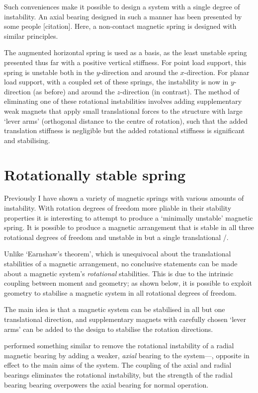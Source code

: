 \documentclass[11pt,a4paper]{memoir}
\begin{document}
Such conveniences make it possible to design a system with a single
degree of instability. An axial bearing designed in such a manner has
been presented by some people [citation]. Here, a non-contact magnetic
spring is designed with similar principles.

The augmented horizontal spring is used as a basis, as the least
unstable spring presented thus far with a positive vertical
stiffness. For point load support, this spring is unstable both in the
$y$-direction and around the $x$-direction. For planar load support,
with a coupled set of these springs, the instability is now in $y$-direction
(as before) and around the $z$-direction (in contrast). The
method of eliminating one of these rotational instabilities involves
adding supplementary weak magnets that apply small translational
forces to the structure with large `lever arms' (orthogonal distance
to the centre of rotation), such that the added translation stiffness
is negligible but the added rotational stiffness is significant and
stabilising.


\section{Rotationally stable spring}

Previously I have shown a variety of magnetic springs with various
amounts of instability. With rotation degrees of freedom more pliable
in their stability properties it is interesting to attempt to produce
a `minimally unstable' magnetic spring. It is possible to produce a
magnetic arrangement that is stable in all three rotational degrees of
freedom and unstable in but a single translational \dof/.

Unlike `Earnshaw's theorem', which is unequivocal about the
translational stabilities of a magnetic arrangement, no conclusive
statements can be made about a magnetic system's \emph{rotational}
stabilities. This is due to the intrinsic coupling between moment and
geometry; as shown below, it is possible to exploit geometry to
stabilise a magnetic system in all rotational degrees of freedom.

The main idea is that a magnetic system can be
stabilised in all but one translational direction, and
supplementary magnets with carefully chosen `lever arms' can be added to the design to stabilise the
rotation directions.

\textcite{delamare1994} performed something similar to remove the
rotational instability of a radial magnetic bearing by adding a
weaker, \emph{axial} bearing to the system—\ie, opposite in effect
to the main aims of the system. The coupling of the axial and radial
bearings eliminates the rotational instability, but the strength of
the radial bearing bearing overpowers the axial bearing for normal
operation.
\end{document}
